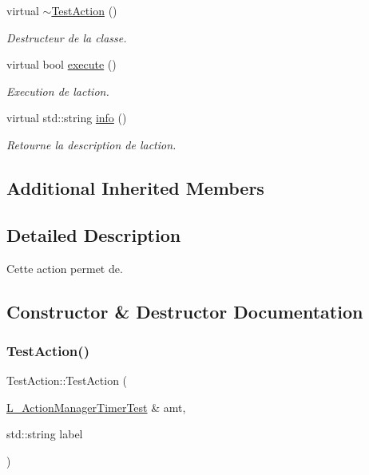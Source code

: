 \begin{DoxyCompactItemize}
\mbox{\label{classTestAction_ae3f7cc56414d35d8160f482efdf806fb}} 
virtual \hyperlink{classTestAction_ae3f7cc56414d35d8160f482efdf806fb}{$\sim$\+Test\+Action} ()
\begin{DoxyCompactList}\small\item\em Destructeur de la classe. \end{DoxyCompactList}\item 
\mbox{\label{classTestAction_a80c76775fe017bd75bc3c23abcbafb43}} 
virtual bool \hyperlink{classTestAction_a80c76775fe017bd75bc3c23abcbafb43}{execute} ()
\begin{DoxyCompactList}\small\item\em Execution de l\textquotesingle{}action. \end{DoxyCompactList}\item 
\mbox{\label{classTestAction_a59dad902e23509086cea9a1adda3224f}} 
virtual std\+::string \hyperlink{classTestAction_a59dad902e23509086cea9a1adda3224f}{info} ()
\begin{DoxyCompactList}\small\item\em Retourne la description de l\textquotesingle{}action. \end{DoxyCompactList}\end{DoxyCompactItemize}
\subsection*{Additional Inherited Members}


\subsection{Detailed Description}
Cette action permet de. 

\subsection{Constructor \& Destructor Documentation}
\mbox{\label{classTestAction_a0c78e7ef31112cd21832f3f168751ae2}} 
\subsubsection{\texorpdfstring{Test\+Action()}{TestAction()}\hspace{0.1cm}{\footnotesize\ttfamily [1/2]}}
{\footnotesize\ttfamily Test\+Action\+::\+Test\+Action (\begin{DoxyParamCaption}\item[{\hyperlink{classL__ActionManagerTimerTest}{L\+\_\+\+Action\+Manager\+Timer\+Test} \&}]{amt,  }\item[{std\+::string}]{label }\end{DoxyParamCaption})}



